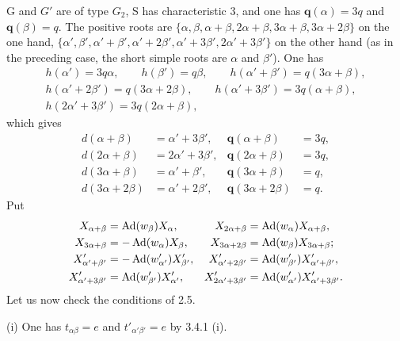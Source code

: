 G and $G'$ are of type $G_2$, S has characteristic 3, and one has $\mathbf q(\alpha)=3q$ and $\mathbf q(\beta)=q$. The positive roots are $\{\alpha,\beta,\alpha+\beta,2\alpha+\beta,3\alpha+\beta,3\alpha+2\beta\}$ on the one hand, $\{\alpha',\beta',\alpha'+\beta',\alpha'+2\beta',\alpha'+3\beta',2\alpha'+3\beta'\}$ on the other hand (as in the preceding case, the short simple roots are $\alpha$ and $\beta'$). One has
\[
\begin{gathered}
h(\alpha')=3q\alpha,\qquad h(\beta')=q\beta,\qquad h(\alpha'+\beta')=q(3\alpha+\beta),\\
h(\alpha'+2\beta')=q(3\alpha+2\beta),\qquad h(\alpha'+3\beta')=3q(\alpha+\beta),\\
h(2\alpha'+3\beta')=3q(2\alpha+\beta),
\end{gathered}
\]
which gives
\[
\begin{aligned}
d(\alpha+\beta)&=\alpha'+3\beta',&\mathbf q(\alpha+\beta)&=3q,\\
d(2\alpha+\beta)&=2\alpha'+3\beta',&\mathbf q(2\alpha+\beta)&=3q,\\
d(3\alpha+\beta)&=\alpha'+\beta',&\mathbf q(3\alpha+\beta)&=q,\\
d(3\alpha+2\beta)&=\alpha'+2\beta',&\mathbf q(3\alpha+2\beta)&=q.
\end{aligned}
\]
Put
\[
\begin{aligned}
X_{\alpha+\beta}&=\operatorname{Ad}(w_\beta)X_\alpha,&X_{2\alpha+\beta}&=\operatorname{Ad}(w_\alpha)X_{\alpha+\beta},\\
X_{3\alpha+\beta}&=-\operatorname{Ad}(w_\alpha)X_\beta,&X_{3\alpha+2\beta}&=\operatorname{Ad}(w_\beta)X_{3\alpha+\beta};\\
X'_{\alpha'+\beta'}&=-\operatorname{Ad}(w'_{\alpha'})X'_{\beta'},&X'_{\alpha'+2\beta'}&=\operatorname{Ad}(w'_{\beta'})X'_{\alpha'+\beta'},\\
X'_{\alpha'+3\beta'}&=\operatorname{Ad}(w'_{\beta'})X'_{\alpha'},&X'_{2\alpha'+3\beta'}&=\operatorname{Ad}(w'_{\alpha'})X'_{\alpha'+3\beta'}.
\end{aligned}
\]
Let us now check the conditions of 2.5.

(i) One has $t_{\alpha\beta}=e$ and $t'_{\alpha'\beta'}=e$ by 3.4.1 (i).


